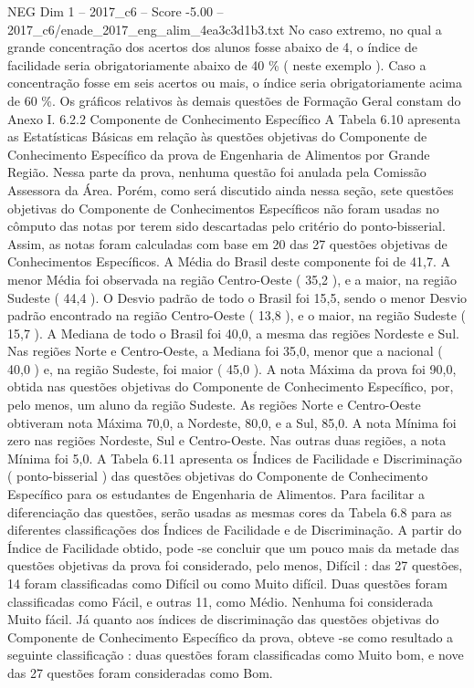 \begin{textsample}{NEG Dim 1 – 2017\_c6 – Score -5.00 – 2017\_c6/enade\_2017\_eng\_alim\_4ea3c3d1b3.txt}
No caso extremo, no qual a grande concentração dos acertos dos alunos fosse abaixo de 4, o índice de facilidade seria obrigatoriamente abaixo de 40 \% ( neste exemplo ).
Caso a concentração fosse em seis acertos ou mais, o índice seria obrigatoriamente acima de 60 \%.
Os gráficos relativos às demais questões de Formação Geral constam do Anexo I. 6.2.2 Componente de Conhecimento Específico A Tabela 6.10 apresenta as Estatísticas Básicas em relação às questões objetivas do Componente de Conhecimento Específico da prova de Engenharia de Alimentos por Grande Região.
Nessa parte da prova, nenhuma questão foi anulada pela Comissão Assessora da Área.
Porém, como será discutido ainda nessa seção, sete questões objetivas do Componente de Conhecimentos Específicos não foram usadas no cômputo das notas por terem sido descartadas pelo critério do ponto-bisserial.
Assim, as notas foram calculadas com base em 20 das 27 questões objetivas de Conhecimentos Específicos.
A Média do Brasil deste componente foi de 41,7.
A menor Média foi observada na região Centro-Oeste ( 35,2 ), e a maior, na região Sudeste ( 44,4 ).
O Desvio padrão de todo o Brasil foi 15,5, sendo o menor Desvio padrão encontrado na região Centro-Oeste ( 13,8 ), e o maior, na região Sudeste ( 15,7 ).
A Mediana de todo o Brasil foi 40,0, a mesma das regiões Nordeste e Sul.
Nas regiões Norte e Centro-Oeste, a Mediana foi 35,0, menor que a nacional ( 40,0 ) e, na região Sudeste, foi maior ( 45,0 ).
A nota Máxima da prova foi 90,0, obtida nas questões objetivas do Componente de Conhecimento Específico, por, pelo menos, um aluno da região Sudeste.
As regiões Norte e Centro-Oeste obtiveram nota Máxima 70,0, a Nordeste, 80,0, e a Sul, 85,0.
A nota Mínima foi zero nas regiões Nordeste, Sul e Centro-Oeste.
Nas outras duas regiões, a nota Mínima foi 5,0.
A Tabela 6.11 apresenta os Índices de Facilidade e Discriminação ( ponto-bisserial ) das questões objetivas do Componente de Conhecimento Específico para os estudantes de Engenharia de Alimentos.
Para facilitar a diferenciação das questões, serão usadas as mesmas cores da Tabela 6.8 para as diferentes classificações dos Índices de Facilidade e de Discriminação.
A partir do Índice de Facilidade obtido, pode -se concluir que um pouco mais da metade das questões objetivas da prova foi considerado, pelo menos, Difícil : das 27 questões, 14 foram classificadas como Difícil ou como Muito difícil.
Duas questões foram classificadas como Fácil, e outras 11, como Médio.
Nenhuma foi considerada Muito fácil.
Já quanto aos índices de discriminação das questões objetivas do Componente de Conhecimento Específico da prova, obteve -se como resultado a seguinte classificação : duas questões foram classificadas como Muito bom, e nove das 27 questões foram consideradas como Bom.

\end{textsample}
